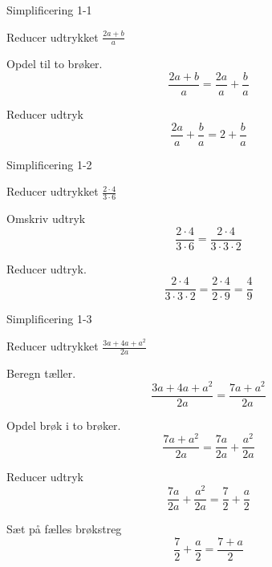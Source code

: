 \documentclass{article}
\begin{document}

\tableofcontents
\newpage

\begin{exercise}{Simplificering 1-1}

Reducer udtrykket $\frac{2a + b}{a}$


\hint

Opdel til to brøker.
\[
\frac{2a + b}{a} = \frac{2a}{a} + \frac{b}{a}
\]

\hint

Reducer udtryk
\[
\frac{2a}{a} + \frac{b}{a} = 2 + \frac{b}{a}
\]

\end{exercise}

\newpage

\begin{exercise}{Simplificering 1-2}

Reducer udtrykket $\frac{2 \cdot 4}{3 \cdot 6}$


\hint

Omskriv udtryk
\[
\frac{2 \cdot 4}{3 \cdot 6} = \frac{2 \cdot 4}{3 \cdot 3 \cdot 2}
\]

\hint

Reducer udtryk.
\[
\frac{2 \cdot 4}{3 \cdot 3 \cdot 2} = \frac{2 \cdot 4}{2 \cdot 9} = \frac{4}{9}
\]

\end{exercise}

\newpage

\begin{exercise}{Simplificering 1-3}

Reducer udtrykket $\frac{3a + 4a + a^2}{2a}$


\hint

Beregn tæller.
\[
\frac{3a + 4a + a^2}{2a} = \frac{7a + a^2}{2a}
\]

\hint

Opdel brøk i to brøker.
\[
\frac{7a + a^2}{2a} = \frac{7a}{2a} + \frac{a^2}{2a}
\]

\hint

Reducer udtryk
\[
\frac{7a}{2a} + \frac{a^2}{2a} = \frac{7}{2} + \frac{a}{2}
\]

\hint

Sæt på fælles brøkstreg
\[
\frac{7}{2} + \frac{a}{2} = \frac{7 + a}{2}
\]

\end{exercise}
\end{document}
